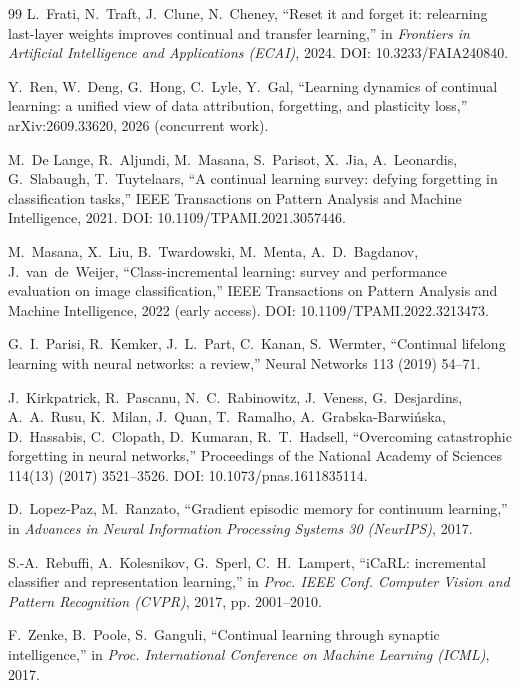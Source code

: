 \documentclass[review,12pt]{elsarticle}
\begin{document}
\begin{thebibliography}{99}
L.~Frati, N.~Traft, J.~Clune, N.~Cheney,
``Reset it and forget it: relearning last-layer weights improves continual
and transfer learning,'' in \emph{Frontiers in Artificial Intelligence and
Applications (ECAI)}, 2024. DOI: 10.3233/FAIA240840.

Y.~Ren, W.~Deng, G.~Hong, C.~Lyle, Y.~Gal,
``Learning dynamics of continual learning: a unified view of data
attribution, forgetting, and plasticity loss,'' arXiv:2609.33620, 2026
(concurrent work).

M.~De Lange, R.~Aljundi, M.~Masana, S.~Parisot, X.~Jia, A.~Leonardis,
G.~Slabaugh, T.~Tuytelaars,
``A continual learning survey: defying forgetting in classification tasks,''
IEEE Transactions on Pattern Analysis and Machine Intelligence, 2021.
DOI: 10.1109/TPAMI.2021.3057446.

M.~Masana, X.~Liu, B.~Twardowski, M.~Menta, A.~D.~Bagdanov, J.~van~de~Weijer,
``Class-incremental learning: survey and performance evaluation on image
classification,'' IEEE Transactions on Pattern Analysis and Machine Intelligence,
2022 (early access). DOI: 10.1109/TPAMI.2022.3213473.

G.~I.~Parisi, R.~Kemker, J.~L.~Part, C.~Kanan, S.~Wermter,
``Continual lifelong learning with neural networks: a review,''
Neural Networks 113 (2019) 54--71.

J.~Kirkpatrick, R.~Pascanu, N.~C.~Rabinowitz, J.~Veness, G.~Desjardins,
A.~A.~Rusu, K.~Milan, J.~Quan, T.~Ramalho, A.~Grabska-Barwi\'{n}ska,
D.~Hassabis, C.~Clopath, D.~Kumaran, R.~T.~Hadsell,
``Overcoming catastrophic forgetting in neural networks,''
Proceedings of the National Academy of Sciences 114(13) (2017) 3521--3526.
DOI: 10.1073/pnas.1611835114.

D.~Lopez-Paz, M.~Ranzato, ``Gradient episodic memory for continuum
learning,'' in \emph{Advances in Neural Information Processing Systems 30
(NeurIPS)}, 2017.

S.-A.~Rebuffi, A.~Kolesnikov, G.~Sperl, C.~H.~Lampert,
``iCaRL: incremental classifier and representation learning,'' in \emph{Proc.
IEEE Conf. Computer Vision and Pattern Recognition (CVPR)}, 2017,
pp. 2001--2010.

F.~Zenke, B.~Poole, S.~Ganguli, ``Continual learning through synaptic
intelligence,'' in \emph{Proc. International Conference on Machine Learning
(ICML)}, 2017.


\end{thebibliography}
\end{document}
